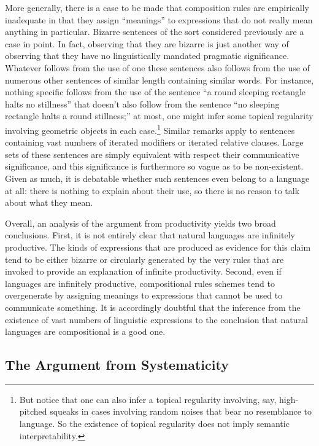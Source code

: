 More generally, there is a case to be made that composition rules are empirically inadequate in that they assign ``meanings'' to expressions that do not really mean anything in particular. Bizarre sentences of the sort considered previously are a case in point. In fact, observing that they are bizarre is just another way of observing that they have no linguistically mandated pragmatic significance. Whatever follows from the use of one these sentences also follows from the use of numerous other sentences of similar length containing similar words. For instance, nothing specific follows from the use of the sentence ``a round sleeping rectangle halts no stillness'' that doesn't also follow from the sentence ``no sleeping rectangle halts a round stillness;'' at most, one might infer some topical regularity involving geometric objects in each case.\footnote{But notice that one can also infer a topical regularity involving, say, high-pitched squeaks in cases involving random noises that bear no resemblance to language. So the existence of topical regularity does not imply semantic interpretability.} Similar remarks apply to sentences containing vast numbers of iterated modifiers or iterated relative clauses. Large sets of these sentences are simply equivalent with respect their communicative significance, and this significance is furthermore so vague as to be non-existent. Given as much, it is debatable whether such sentences even belong to a language at all: there is nothing to explain about their use, so there is no reason to talk about what they mean. 

Overall, an analysis of the argument from productivity yields two broad conclusions. First, it is not entirely clear that natural languages are infinitely productive. The kinds of expressions that are produced as evidence for this claim tend to be either bizarre or circularly generated by the very rules that are invoked to provide an explanation of infinite productivity. Second, even if languages are infinitely productive, compositional rules schemes tend to overgenerate by assigning meanings to expressions that cannot be used to communicate something. It is accordingly doubtful that the inference from the existence of vast numbers of linguistic expressions to the conclusion that natural languages are compositional is a good one. 

\subsection{The Argument from Systematicity}

